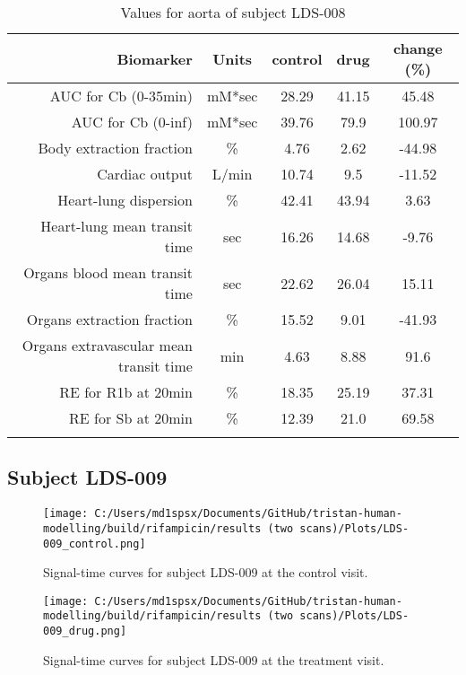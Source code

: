 \documentclass{epflreport}%
\begin{document}
\begin{longtable}{rcccc}%
\hline%
Biomarker&Units&control&drug&change (\%)\\%
\hline%
AUC for Cb (0{-}35min)&mM*sec&28.29&41.15&45.48\\%
AUC for Cb (0{-}inf)&mM*sec&39.76&79.9&100.97\\%
Body extraction fraction&\%&4.76&2.62&{-}44.98\\%
Cardiac output&L/min&10.74&9.5&{-}11.52\\%
Heart{-}lung dispersion&\%&42.41&43.94&3.63\\%
Heart{-}lung mean transit time&sec&16.26&14.68&{-}9.76\\%
Organs blood mean transit time&sec&22.62&26.04&15.11\\%
Organs extraction fraction&\%&15.52&9.01&{-}41.93\\%
Organs extravascular mean transit time&min&4.63&8.88&91.6\\%
RE for R1b at 20min&\%&18.35&25.19&37.31\\%
RE for Sb at 20min&\%&12.39&21.0&69.58\\%
\hline%
\caption{Values for aorta of subject LDS-008} \\%
\end{longtable}%
\clearpage%
\subsection{Subject LDS{-}009}%
\label{subsec:SubjectLDS{-}009}%

%


\begin{figure}[h!]%
\centering%
\texttt{[image: C:/Users/md1spsx/Documents/GitHub/tristan-human-modelling/build/rifampicin/results (two scans)/Plots/LDS-009\_control.png]}%
\caption{Signal{-}time curves for subject LDS{-}009 at the control visit.}%
\end{figure}

%


\begin{figure}[h!]%
\centering%
\texttt{[image: C:/Users/md1spsx/Documents/GitHub/tristan-human-modelling/build/rifampicin/results (two scans)/Plots/LDS-009\_drug.png]}%
\caption{Signal{-}time curves for subject LDS{-}009 at the treatment visit.}%
\end{figure}
\end{document}
